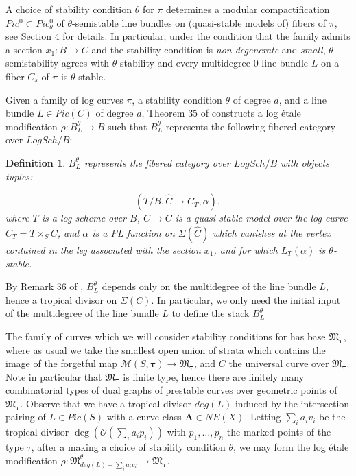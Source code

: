 \documentclass[12pt, oneside]{amsart}   	%
\newcounter{thm}
\newtheorem{definition}[thm]{Definition}
\numberwithin{equation}{section}
\numberwithin{thm}{section}
\numberwithin{figure}{section}
\begin{document}
A choice of stability condition $\theta$ for $\pi$ determines a modular compactification $Pic^0 \subset Pic^0_{\theta}$ of $\theta$-semistable line bundles on (quasi-stable models of) fibers of $\pi$, see \cite{logDR} Section $4$ for details. In particular, under the condition that the family admits a section $x_1: B \rightarrow C$ and the stability condition is \emph{non-degenerate} and \emph{small}, $\theta$-semistability agrees with $\theta$-stability and every multidegree $0$ line bundle $L$ on a fiber $C_s$ of $\pi$ is $\theta$-stable. 

Given a family of log curves $\pi$, a stability condition $\theta$ of degree $d$, and a line bundle $L \in Pic(C)$ of degree $d$, Theorem $35$ of \cite{logDR} constructs a log \'etale modification $\rho: B^\theta_L \rightarrow B$ such that $B^{\theta}_{L}$ represents the following fibered category over $LogSch/B$:

\begin{definition}
$B^{\theta}_{L}$ represents the fibered category over $LogSch/B$ with objects tuples:

\[(T/B,\widehat{C}\rightarrow C_T,\alpha),\]
where $T$ is a log scheme over $B$, $\widehat{C}\rightarrow C$ is a quasi stable model over the log curve $C_T = T\times_S C$, and $\alpha$ is a PL function on $\Sigma(\widehat{C})$ which vanishes at the vertex contained in the leg associated with the section $x_1$, and for which $L_T(\alpha)$ is $\theta$-stable. 

\end{definition}
By Remark $36$ of \cite{logDR}, $B^\theta_L$ depends only on the multidegree of the line bundle $L$, hence a tropical divisor on $\Sigma(C)$. In particular, we only need the initial input of the multidegree of the line bundle $L$ to define the stack $B^{\theta}_{L}$

The family of curves which we will consider stability conditions for has base $\mathfrak{M}_{\pmb\tau}$, where as usual we take the smallest open union of strata which contains the image of the forgetful map $\mathscr{M}(S,\pmb\tau) \rightarrow \mathfrak{M}_{\pmb\tau}$, and $C$ the universal curve over $\mathfrak{M}_{\pmb\tau}$. Note in particular that $\mathfrak{M}_{\pmb\tau}$ is finite type, hence there are finitely many combinatorial types of dual graphs of prestable curves over geometric points of $\mathfrak{M}_{\pmb\tau}$. Observe that we have a tropical divisor $deg(L)$ induced by the intersection pairing of $L \in Pic(S)$ with a curve class $\textbf{A} \in NE(X)$. Letting $\sum_i a_iv_i$ be the tropical divisor $\deg(\mathcal{O}(\sum_i a_ip_i))$ with $p_1,\ldots,p_n$ the marked points of the type $\tau$, after a making a choice of stability condition $\theta$, we may form the log \'etale modification $\rho: \mathfrak{M}^\theta_{deg(L) - \sum_i a_iv_i} \rightarrow \mathfrak{M}_{\pmb\tau}$. 
\end{document}
